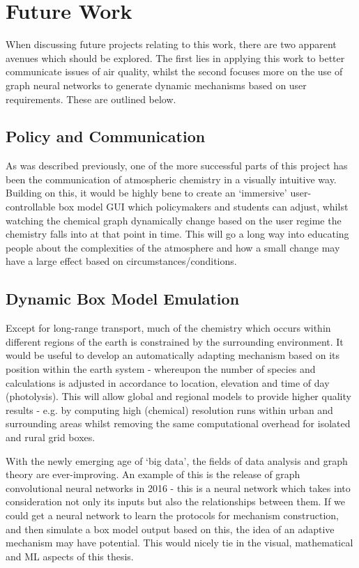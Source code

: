 \section{Future Work}\label{sec:futurework}
When discussing future projects relating to this work, there are two apparent avenues which should be explored. The first lies in applying this work to better communicate issues of air quality, whilst the second focuses more on the use of graph neural networks to generate dynamic mechanisms based on user requirements. These are outlined below.

\subsection{Policy and Communication}
As was described previously, one of the more successful parts of this project has been the communication of atmospheric chemistry in a visually intuitive way. Building on this, it would be highly bene to create an `immersive' user-controllable box model GUI which policymakers and students can adjust, whilst watching the chemical graph dynamically change based on the user regime the chemistry falls into at that point in time. This will go a long way into educating people about the complexities of the atmosphere and how a small change may have a large effect based on circumstances/conditions.

\subsection{Dynamic Box Model Emulation}
Except for long-range transport, much of the chemistry which occurs within different regions of the earth is constrained by the surrounding environment. It would be useful to develop an automatically adapting mechanism based on its position within the earth system - whereupon the number of species and calculations is adjusted in accordance to location, elevation and time of day (photolysis). This will allow global and regional models to provide higher quality results - e.g. by computing high (chemical) resolution runs within urban and surrounding areas whilst removing the same computational overhead for isolated and rural grid boxes.


With the newly emerging age of `big data', the fields of data analysis and graph theory are ever-improving. An example of this is the release of graph convolutional neural networks in 2016 - this is a neural network which takes into consideration not only its inputs but also the relationships between them. If we could get a neural network to learn the protocols for mechanism construction, and then simulate a box model output based on this, the idea of an adaptive mechanism may have potential. This would nicely tie in the visual, mathematical and ML aspects of this thesis.




